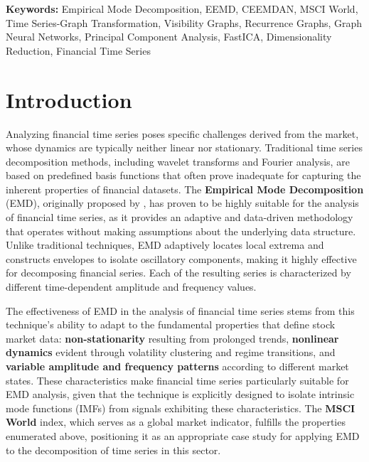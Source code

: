 \documentclass[11pt,a4paper]{article}
\begin{document}
\vspace{0.5cm}

{\normalfont\normalsize\noindent\textbf{Keywords:} Empirical Mode Decomposition, EEMD, CEEMDAN, MSCI World, Time Series-Graph Transformation, Visibility Graphs, Recurrence Graphs, Graph Neural Networks, Principal Component Analysis, FastICA, Dimensionality Reduction, Financial Time Series}

\newpage
\tableofcontents
\newpage

\section{Introduction}

Analyzing financial time series poses specific challenges derived from the market, whose dynamics are typically neither linear nor stationary. Traditional time series decomposition methods, including wavelet transforms and Fourier analysis, are based on predefined basis functions that often prove inadequate for capturing the inherent properties of financial datasets. The \textbf{Empirical Mode Decomposition} (EMD), originally proposed by \citep{huang1998empirical}, has proven to be highly suitable for the analysis of financial time series, as it provides an adaptive and data-driven methodology that operates without making assumptions about the underlying data structure. Unlike traditional techniques, EMD adaptively locates local extrema and constructs envelopes to isolate oscillatory components, making it highly effective for decomposing financial series. Each of the resulting series is characterized by different time-dependent amplitude and frequency values.

The effectiveness of EMD in the analysis of financial time series stems from this technique's ability to adapt to the fundamental properties that define stock market data: \textbf{non-stationarity} resulting from prolonged trends, \textbf{nonlinear dynamics} evident through volatility clustering and regime transitions, and \textbf{variable amplitude and frequency patterns} according to different market states. These characteristics make financial time series particularly suitable for EMD analysis, given that the technique is explicitly designed to isolate intrinsic mode functions (IMFs) from signals exhibiting these characteristics. The \textbf{MSCI World} index, which serves as a global market indicator, fulfills the properties enumerated above, positioning it as an appropriate case study for applying EMD to the decomposition of time series in this sector.
\end{document}
